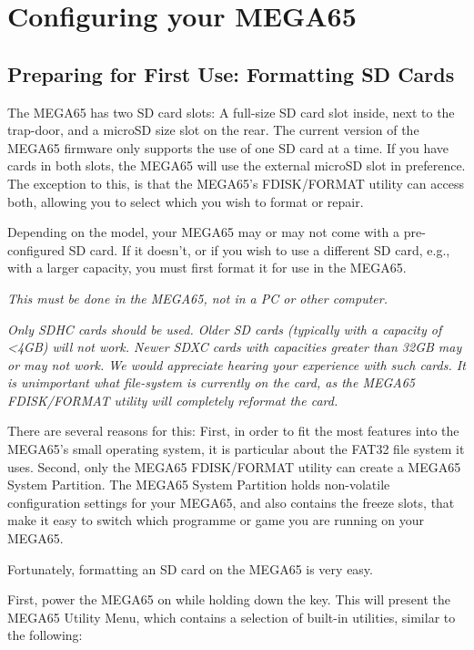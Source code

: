 \chapter{Configuring your MEGA65}
\label{cha:configuring}

\section{Preparing for First Use: Formatting SD Cards}

The MEGA65 has two SD card slots: A full-size SD card slot inside, next to
the trap-door, and a microSD size slot on the rear.  The current version
of the MEGA65 firmware only supports the use of one SD card at a time.
If you have cards in both slots, the MEGA65 will use the external microSD
slot in preference.  The exception to this, is that the MEGA65's FDISK/FORMAT
utility can access both, allowing you to select which you wish to format or
repair.

Depending on the model, your MEGA65 may or may not come with a pre-configured SD card.
If it doesn't, or if you wish to use a different SD card, e.g., with a
larger capacity, you must first format it for use in the MEGA65.

{\em This must be done in the MEGA65, not in a PC or other computer.}

{\em Only SDHC cards should be used. Older SD cards (typically with
  a capacity of <4GB) will not work.  Newer SDXC cards with
  capacities greater than 32GB may or may not work.  We would
  appreciate hearing your experience with such cards. It is unimportant
  what file-system is currently on the card, as the MEGA65
  FDISK/FORMAT utility will completely reformat the card.}

There are several reasons for this: First, in order to fit the most
features into the MEGA65's small operating system, it is
particular about the FAT32 file system it uses. Second, only the
MEGA65 FDISK/FORMAT utility can create a MEGA65 System Partition. The
MEGA65 System Partition holds non-volatile configuration settings for
your MEGA65, and also contains the freeze slots, that make it easy to
switch which programme or game you are running on your MEGA65.

Fortunately, formatting an SD card on the MEGA65 is very easy.

First, power the MEGA65 on while holding down the  key.
This will present the MEGA65 Utility Menu, which contains a
selection of built-in utilities, similar to the following:

